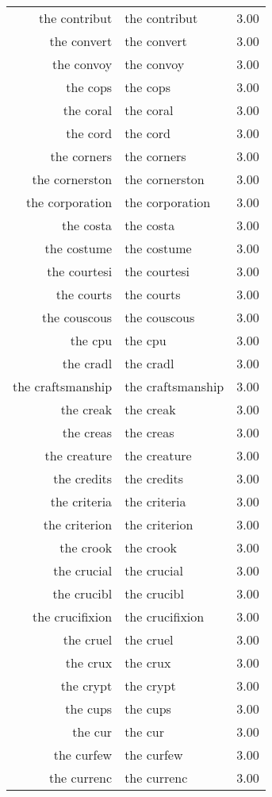 \begin{table}[ht]
\begin{tabular}{rlr}
  the contribut & the contribut & 3.00 \\ 
  the convert & the convert & 3.00 \\ 
  the convoy & the convoy & 3.00 \\ 
  the cops & the cops & 3.00 \\ 
  the coral & the coral & 3.00 \\ 
  the cord & the cord & 3.00 \\ 
  the corners & the corners & 3.00 \\ 
  the cornerston & the cornerston & 3.00 \\ 
  the corporation & the corporation & 3.00 \\ 
  the costa & the costa & 3.00 \\ 
  the costume & the costume & 3.00 \\ 
  the courtesi & the courtesi & 3.00 \\ 
  the courts & the courts & 3.00 \\ 
  the couscous & the couscous & 3.00 \\ 
  the cpu & the cpu & 3.00 \\ 
  the cradl & the cradl & 3.00 \\ 
  the craftsmanship & the craftsmanship & 3.00 \\ 
  the creak & the creak & 3.00 \\ 
  the creas & the creas & 3.00 \\ 
  the creature & the creature & 3.00 \\ 
  the credits & the credits & 3.00 \\ 
  the criteria & the criteria & 3.00 \\ 
  the criterion & the criterion & 3.00 \\ 
  the crook & the crook & 3.00 \\ 
  the crucial & the crucial & 3.00 \\ 
  the crucibl & the crucibl & 3.00 \\ 
  the crucifixion & the crucifixion & 3.00 \\ 
  the cruel & the cruel & 3.00 \\ 
  the crux & the crux & 3.00 \\ 
  the crypt & the crypt & 3.00 \\ 
  the cups & the cups & 3.00 \\ 
  the cur & the cur & 3.00 \\ 
  the curfew & the curfew & 3.00 \\ 
  the currenc & the currenc & 3.00 \\ 

\end{tabular}
\end{table}
